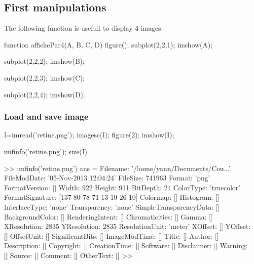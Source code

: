 \def\QRCODE{TB_image_TUT.IMG.introduction_matlabqrcode.png}
\def\QRPAGE{http://www.iptutorials.science/tree/master/TB_image/TUT.IMG.introduction/matlab}


\subsection{First manipulations}

The following function is usefull to display 4 images:
\begin{matlab}
function affichePar4(A, B, C, D)
figure();
subplot(2,2,1);
imshow(A);

subplot(2,2,2);
imshow(B);

subplot(2,2,3);
imshow(C);

subplot(2,2,4);
imshow(D);
\end{matlab}

\subsubsection{Load and save image}
\begin{matlab}
I=imread('retine.png');
imagesc(I);
figure(2);
imshow(I);

imfinfo('retine.png');
size(I)
\end{matlab}

\begin{mwindow}
>> imfinfo('retine.png')
ans = 
                  Filename: '/home/yann/Documents/Cou...'
               FileModDate: '05-Nov-2013 12:04:24'
                  FileSize: 741963
                    Format: 'png'
             FormatVersion: []
                     Width: 922
                    Height: 911
                  BitDepth: 24
                 ColorType: 'truecolor'
           FormatSignature: [137 80 78 71 13 10 26 10]
                  Colormap: []
                 Histogram: []
             InterlaceType: 'none'
              Transparency: 'none'
    SimpleTransparencyData: []
           BackgroundColor: []
           RenderingIntent: []
            Chromaticities: []
                     Gamma: []
               XResolution: 2835
               YResolution: 2835
            ResolutionUnit: 'meter'
                   XOffset: []
                   YOffset: []
                OffsetUnit: []
           SignificantBits: []
              ImageModTime: []
                     Title: []
                    Author: []
               Description: []
                 Copyright: []
              CreationTime: []
                  Software: []
                Disclaimer: []
                   Warning: []
                    Source: []
                   Comment: []
                 OtherText: []
>> 
\end{mwindow}

